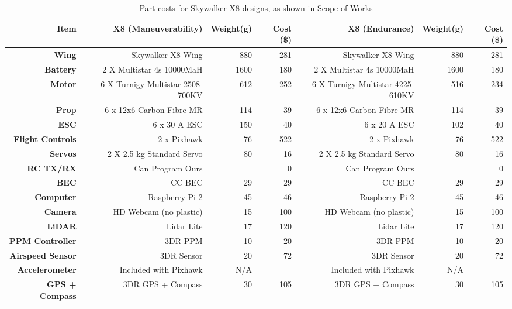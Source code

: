 \begin{landscape}
\begin{table}[!htbp]
	\centering
	\caption{Part costs for Skywalker X8 designs, as shown in Scope of Works}
	\begin{tabular}{|r|r|r|r|r|r|r|}
		\hline 
		\textbf{Item} & \textbf{X8 (Maneuverability)} & \textbf{Weight(g)} & \textbf{Cost (\$)} & \textbf{X8 (Endurance)} & \textbf{Weight(g)} & \textbf{Cost (\$)}\\
		\hline
		\textbf{Wing} & Skywalker X8 Wing & 880 & 281 & Skywalker X8 Wing & 880 & 281\\
		\hline
		\textbf{Battery} & 2 X Multistar 4s 10000MaH & 1600 & 180 & 2 X Multistar 4s 10000MaH & 1600 & 180\\
		\hline
		\textbf{Motor} & 6 X Turnigy Multistar 2508-700KV & 612 & 252 & 6 X Turnigy Multistar 4225-610KV & 516 & 234\\
		\hline
		\textbf{Prop} & 6 x 12x6 Carbon Fibre MR & 114 & 39 & 6 x 12x6 Carbon Fibre MR & 114 & 39\\
		\hline
		\textbf{ESC} & 6 x 30 A ESC & 150 & 40 & 6 x 20 A ESC & 102 & 40\\
		\hline
		\textbf{Flight Controls} & 2 x Pixhawk & 76 & 522 & 2 x Pixhawk & 76 & 522\\
		\hline
		\textbf{Servos} & 2 X 2.5 kg Standard Servo & 80 & 16 & 2 X 2.5 kg Standard Servo & 80 & 16\\
		\hline
		\textbf{RC TX/RX} & Can Program Ours & & 0 & Can Program Ours & & 0\\
		\hline
		\textbf{BEC} & CC BEC & 29 & 29 & CC BEC & 29 & 29\\
		\hline
		\textbf{Computer} & Raspberry Pi 2 & 45 & 46 & Raspberry Pi 2 & 45 & 46\\
		\hline
		\textbf{Camera} & HD Webcam (no plastic) & 15 & 100 & HD Webcam (no plastic) & 15 & 100\\
		\hline
		\textbf{LiDAR} & Lidar Lite & 17 & 120 & Lidar Lite & 17 & 120\\
		\hline
		\textbf{PPM Controller} & 3DR PPM  & 10 & 20 & 3DR PPM & 10 & 20\\
		\hline
		\textbf{Airspeed Sensor} & 3DR Sensor & 20 & 72 & 3DR Sensor & 20 & 72\\
		\hline
		\textbf{Accelerometer} & Included with Pixhawk & N/A & & Included with Pixhawk & N/A & \\
		\hline
		\textbf{GPS + Compass} & 3DR GPS + Compass & 30 & 105 & 3DR GPS + Compass & 30 & 105\\
		\hline

\end{tabular}
\end{table}
\end{landscape}
